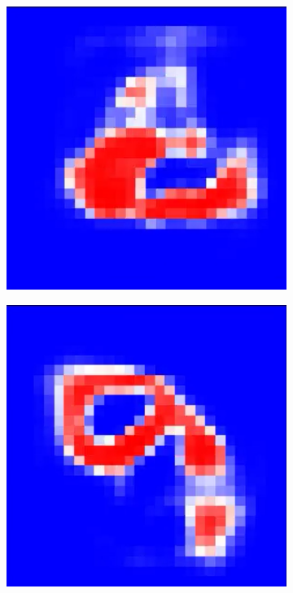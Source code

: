 \documentclass[a4paper]{article}
\begin{document}
\begin{figure}[ht]
\begin{subfigure}[b]{0.095\textwidth}
  \end{subfigure}
    \begin{subfigure}[b]{0.095\textwidth}
   \includegraphics[width=\linewidth]{figures/2.png}
  \end{subfigure}
    \begin{subfigure}[b]{0.095\textwidth}
   \includegraphics[width=\linewidth]{figures/3.png}

\end{subfigure}
\end{figure}
\end{document}
